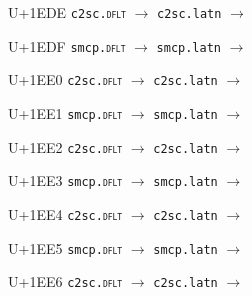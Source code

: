 \documentclass{article}
\begin{document}
\begin{substitutions}
\goodbreak

U+1EDE  \linebreak
    \texttt{c2sc.\textsc{dflt}} $\to$  \linebreak
    \texttt{c2sc.latn} $\to$  

\goodbreak

U+1EDF  \linebreak
    \texttt{smcp.\textsc{dflt}} $\to$  \linebreak
    \texttt{smcp.latn} $\to$  

\goodbreak

U+1EE0  \linebreak
    \texttt{c2sc.\textsc{dflt}} $\to$  \linebreak
    \texttt{c2sc.latn} $\to$  

\goodbreak

U+1EE1  \linebreak
    \texttt{smcp.\textsc{dflt}} $\to$  \linebreak
    \texttt{smcp.latn} $\to$  

\goodbreak

U+1EE2  \linebreak
    \texttt{c2sc.\textsc{dflt}} $\to$  \linebreak
    \texttt{c2sc.latn} $\to$  

\goodbreak

U+1EE3  \linebreak
    \texttt{smcp.\textsc{dflt}} $\to$  \linebreak
    \texttt{smcp.latn} $\to$  

\goodbreak

U+1EE4  \linebreak
    \texttt{c2sc.\textsc{dflt}} $\to$  \linebreak
    \texttt{c2sc.latn} $\to$  

\goodbreak

U+1EE5  \linebreak
    \texttt{smcp.\textsc{dflt}} $\to$  \linebreak
    \texttt{smcp.latn} $\to$  

\goodbreak

U+1EE6  \linebreak
    \texttt{c2sc.\textsc{dflt}} $\to$  \linebreak
    \texttt{c2sc.latn} $\to$  


\end{substitutions}
\end{document}
